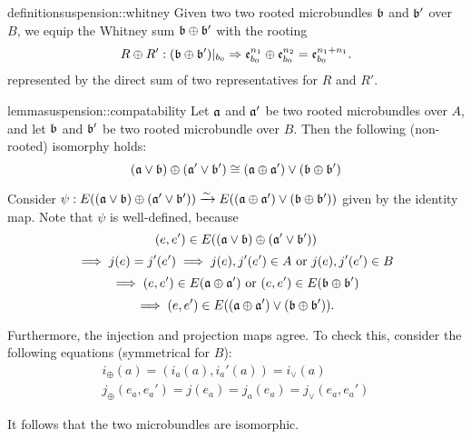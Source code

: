 \begin{mystatement}{definition}{suspension::whitney}
    Given two two rooted microbundles $\bb$ and $\bb'$ over $B$,
    we equip the Whitney sum $\whitney{\bb}{\bb'}$ with the rooting
    \[ \germdef{\whitney{R}{R'}}{(\whitney{\bb}{\bb'})\restr{b_0}}{\whitney{\be[n_1]{b_0}}{\be[n_2]{b_0}} = \be[n_1 + n_1]{b_0}}. \]
    represented by the direct sum of two representatives for $R$ and $R'$.
\end{mystatement}

\begin{mystatement}{lemma}{suspension::compatability}
    Let $\mathfrak{a}$ and $\mathfrak{a}'$ be two rooted microbundles over $A$,
    and let $\bb$ and $\bb'$ be two rooted microbundle over $B$.
    Then the following (non-rooted) isomorphy holds:
    \[ \whitney{(\ba \vee \bb)}{(\ba' \vee \bb')} \cong (\whitney{\ba}{\ba'}) \vee (\whitney{\bb}{\bb'}) \]
\end{mystatement}

\begin{myproof}
    Consider $\psi: E(\whitney{(\ba \vee \bb)}{(\ba' \vee \bb')}) \isomto E((\whitney{\ba}{\ba'}) \vee (\whitney{\bb}{\bb'}))$
    given by the identity map.
    Note that $\psi$ is well-defined, because
    \[ (e, e') \in E(\whitney{(\ba \vee \bb)}{(\ba' \vee \bb')}) \]
    \[ \implies j(e) = j'(e') \implies j(e), j'(e') \in A \text{ or } j(e), j'(e') \in B\]
    \[ \implies (e, e') \in E(\whitney{\ba}{\ba'}) \tor (e, e') \in E(\whitney{\bb}{\bb'}) \]
    \[ \implies (e, e') \in E((\whitney{\ba}{\ba'}) \vee (\whitney{\bb}{\bb'})). \]

    Furthermore, the injection and projection maps agree.
    To check this, consider the following equations (symmetrical for $B$):
    \begin{gather}
        i_\oplus(a) = (i_a(a), i_a'(a)) = i_\vee(a) \\
        j_\oplus(e_a, e_a') = j(e_a) = j_a(e_a) =  j_\vee(e_a, e_a')
    \end{gather}

    It follows that the two microbundles are isomorphic.
\end{myproof}